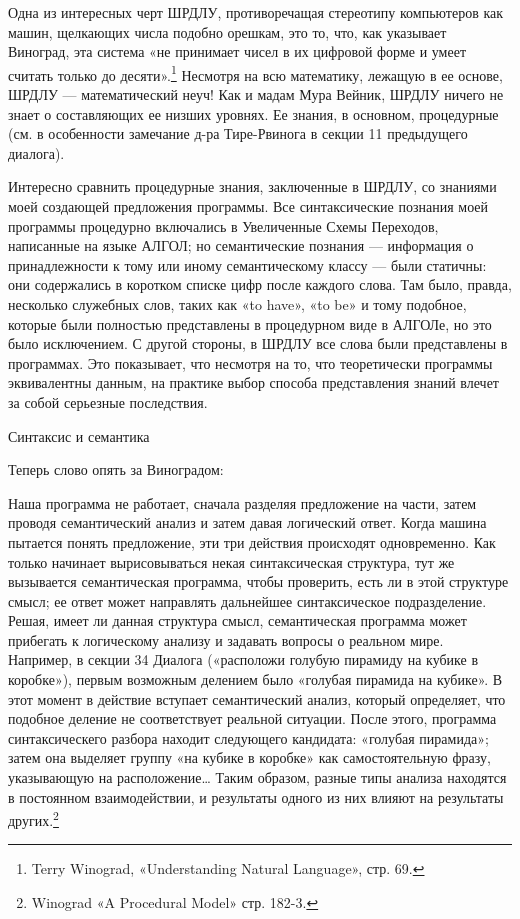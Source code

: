 Одна из интересных черт ШРДЛУ, противоречащая стереотипу компьютеров как машин, щелкающих числа подобно орешкам, это то, что, как указывает Виноград, эта система «не принимает чисел в их цифровой форме и умеет считать только до десяти».\footnote{Terry Winograd, «Understanding Natural Language», стр. 69.} Несмотря на всю математику, лежащую в ее основе, ШРДЛУ --- математический неуч! Как и мадам Мура Вейник, ШРДЛУ ничего не знает о составляющих ее низших уровнях. Ее знания, в основном, процедурные (см. в особенности замечание д-ра Тире-Рвинога в секции 11 предыдущего диалога).

Интересно сравнить процедурные знания, заключенные в ШРДЛУ, со знаниями моей создающей предложения программы. Все синтаксические познания моей программы процедурно включались в Увеличенные Схемы Переходов, написанные на языке АЛГОЛ; но семантические познания --- информация о принадлежности к тому или иному семантическому классу --- были статичны: они содержались в коротком списке цифр после каждого слова. Там было, правда, несколько служебных слов, таких как «to have», «to be» и тому подобное, которые были полностью представлены в процедурном виде в АЛГОЛе, но это было исключением. С другой стороны, в ШРДЛУ все слова были представлены в программах. Это показывает, что несмотря на то, что теоретически программы эквивалентны данным, на практике выбор способа представления знаний влечет за собой серьезные последствия.

Синтаксис и семантика

Теперь слово опять за Виноградом:

Наша программа не работает, сначала разделяя предложение на части, затем проводя семантический анализ и затем давая логический ответ. Когда машина пытается понять предложение, эти три действия происходят одновременно. Как только начинает вырисовываться некая синтаксическая структура, тут же вызывается семантическая программа, чтобы проверить, есть ли в этой структуре смысл; ее ответ может направлять дальнейшее синтаксическое подразделение. Решая, имеет ли данная структура смысл, семантическая программа может прибегать к логическому анализу и задавать вопросы о реальном мире. Например, в секции 34 Диалога («расположи голубую пирамиду на кубике в коробке»), первым возможным делением было «голубая пирамида на кубике». В этот момент в действие вступает семантический анализ, который определяет, что подобное деление не соответствует реальной ситуации. После этого, программа синтаксическего разбора находит следующего кандидата: «голубая пирамида»; затем она выделяет группу «на кубике в коробке» как самостоятельную фразу, указывающую на расположение\ldots{} Таким образом, разные типы анализа находятся в постоянном взаимодействии, и результаты одного из них влияют на результаты других.\footnote{Winograd «A Procedural Model» стр. 182-3.}


